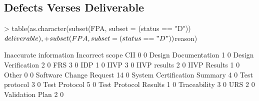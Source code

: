 \documentclass{article}
\begin{document}
\subsection{Defects Verses Deliverable}

\begin{Schunk}
\begin{Sinput}
> table(as.character(subset(FPA, subset = (status == "D"))$deliverable),
+       subset(FPA, subset = (status == "D"))$reason)
\end{Sinput}
\begin{Soutput}
                               Inaccurate information Incorrect scope
  CII                                               0               0
  Design Documentation                              1               0
  Design Verification                               2               0
  FRS                                               3               0
  IDP                                               1               0
  IIVP                                              3               0
  IIVP results                                      2               0
  IIVP Results                                      1               0
  Other                                             0               0
  Software Change Request                          14               0
  System Certification Summary                      4               0
  Test protocol                                     3               0
  Test Protocol                                     5               0
  Test Protocol Results                             1               0
  Traceability                                      3               0
  URS                                               2               0
  Validation Plan                                   2               0
                              

\end{Soutput}
\end{Schunk}
\end{document}
